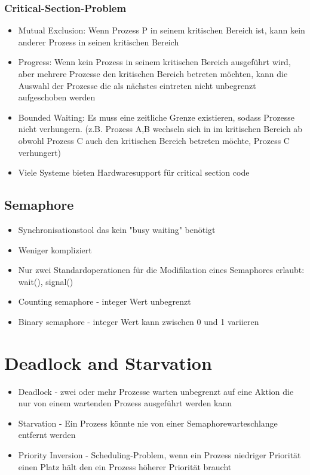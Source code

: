 \documentclass[a4paper]{scrreprt}
\begin{document}
	\subsubsection{Critical-Section-Problem}
		\begin{itemize}
			\item Mutual Exclusion: Wenn Prozess P in seinem kritischen Bereich ist, kann kein anderer Prozess in seinen kritischen Bereich
			\item Progress:  Wenn kein Prozess in seinem kritischen Bereich ausgeführt wird, aber mehrere Prozesse den kritischen Bereich betreten möchten, kann die Auswahl der Prozesse die als nächstes eintreten nicht unbegrenzt aufgeschoben werden
			\item Bounded Waiting: Es muss eine zeitliche Grenze existieren, sodass Prozesse nicht verhungern. (z.B. Prozess A,B wechseln sich in im kritischen Bereich ab obwohl Prozess C auch den kritischen Bereich betreten möchte, Prozess C verhungert)
			\item Viele Systeme bieten Hardwaresupport für critical section code
		\end{itemize}
	\subsection{Semaphore}
		\begin{itemize}
			\item Synchronisationstool das kein "busy waiting" benötigt
			\item Weniger kompliziert
			\item Nur zwei Standardoperationen für die Modifikation eines Semaphores erlaubt: wait(), signal()
			\item Counting semaphore - integer Wert unbegrenzt
			\item Binary semaphore - integer Wert kann zwischen 0 und 1 variieren 
		\end{itemize}

\section{Deadlock and Starvation}
		\begin{itemize}
			\item Deadlock - zwei oder mehr Prozesse warten unbegrenzt auf eine Aktion die nur von einem wartenden Prozess ausgeführt werden kann
			\item Starvation - Ein Prozess könnte nie von einer Semaphorewarteschlange entfernt werden
			\item Priority Inversion - Scheduling-Problem, wenn ein Prozess niedriger Priorität einen Platz hält den ein Prozess höherer Priorität braucht
		\end{itemize}
		
\end{document}

